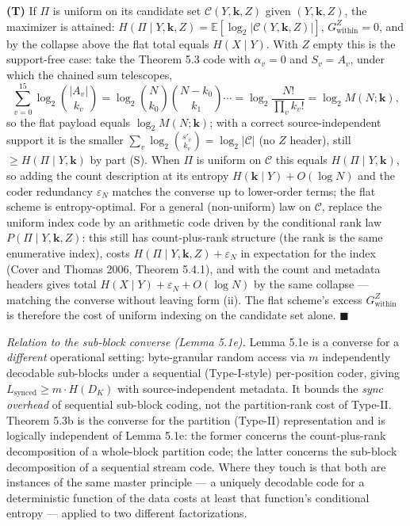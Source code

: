 \documentclass[
]{article}
\begin{document}
\textbf{(T)} If $\Pi$ is uniform on its candidate set
$\mathcal{C}(Y, \mathbf{k}, Z)$ given $(Y, \mathbf{k}, Z)$, the maximizer
is attained: $H(\Pi \mid Y, \mathbf{k}, Z) = \mathbb{E}[\log_2 |\mathcal{C}(Y,\mathbf{k},Z)|]$,
$G_{\mathrm{within}}^{Z} = 0$, and by the collapse above the flat total
equals $H(X \mid Y)$. With $Z$ empty this is the support-free case: take
the Theorem 5.3 code with $\alpha_v = 0$ and $S_v = A_v$, under which the
chained sum telescopes,
\[
\sum_{v=0}^{15} \log_2 \binom{|A_v|}{k_v} = \log_2 \binom{N}{k_0}\binom{N - k_0}{k_1}\cdots = \log_2 \frac{N!}{\prod_v k_v!} = \log_2 M(N; \mathbf{k}),
\]
so the flat payload equals $\log_2 M(N; \mathbf{k})$; with a correct
source-independent support it is the smaller
$\sum_v \log_2 \binom{s'_v}{k_v} = \log_2 |\mathcal{C}|$ (no $Z$ header),
still $\geq H(\Pi \mid Y, \mathbf{k})$ by part (S). When $\Pi$ is uniform
on $\mathcal{C}$ this equals $H(\Pi \mid Y, \mathbf{k})$, so adding the
count description at its entropy $H(\mathbf{k} \mid Y) + O(\log N)$ and
the coder redundancy $\varepsilon_N$ matches the converse up to lower-order
terms; the flat scheme is entropy-optimal. For a general (non-uniform)
law on $\mathcal{C}$, replace the uniform index code by an arithmetic code
driven by the conditional rank law $P(\Pi \mid Y, \mathbf{k}, Z)$: this
still has count-plus-rank structure (the rank is the same enumerative
index), costs $H(\Pi \mid Y, \mathbf{k}, Z) + \varepsilon_N$ in
expectation for the index (Cover and Thomas 2006, Theorem 5.4.1), and with
the count and metadata headers gives total
$H(X \mid Y) + \varepsilon_N + O(\log N)$ by the same collapse --- matching
the converse without leaving form (ii). The flat scheme's excess
$G_{\mathrm{within}}^{Z}$ is therefore the cost of uniform indexing on the
candidate set alone. \hfill$\blacksquare$

\emph{Relation to the sub-block converse (Lemma 5.1e).} Lemma 5.1e is a
converse for a \emph{different} operational setting: byte-granular
random access via $m$ independently decodable sub-blocks under a
sequential (Type-I-style) per-position coder, giving
$L_{\mathrm{synced}} \geq m \cdot H(D_K)$ with source-independent
metadata. It bounds the \emph{sync overhead} of sequential sub-block
coding, not the partition-rank cost of Type-II. Theorem 5.3b is the
converse for the partition (Type-II) representation and is logically
independent of Lemma 5.1e: the former concerns the count-plus-rank
decomposition of a whole-block partition code; the latter concerns the
sub-block decomposition of a sequential stream code. Where they touch is
that both are instances of the same master principle --- a uniquely
decodable code for a deterministic function of the data costs at least
that function's conditional entropy --- applied to two different
factorizations.
\end{document}
